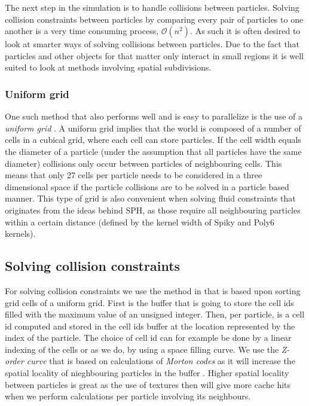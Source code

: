 The next step in the simulation is to handle collisions between particles.
Solving collision constraints between particles by comparing every pair of
particles to one another is a very time consuming process,
$\mathcal{O}(n^{2})$. As such it is often desired to look at smarter ways of
solving collisions between particles. Due to the fact that particles and other
objects for that matter only interact in small regions it is well suited to
look at methods involving spatial subdivisions.

\subsubsection{Uniform grid}

One such method that also performs well and is easy to parallelize is the use
of a \textit{uniform grid} \cite{Green}. A uniform grid implies that the world
is composed of a number of cells in a cubical grid, where each cell can store
particles. If the cell width equals the diameter of a particle (under the
assumption that all particles have the same diameter) collisions only occur
between particles of neighbouring cells. This means that only 27 cells per
particle needs to be considered in a three dimensional space if the particle
collisions are to be solved in a particle based manner. This type of grid is
also convenient when solving fluid constraints that originates from the ideas
behind SPH, as those require all neighbouring particles within a certain
distance (defined by the kernel width of Spiky and Poly6 kernels).

\subsection{Solving collision constraints}

For solving collision constraints we use the method in
\cite{Green} that is based upon sorting grid cells of a uniform grid. First is
the buffer that is going to store the cell ids filled with the maximum value of
an unsigned integer.  Then, per particle, is a cell id computed and stored in
the cell ids buffer at the location represented by the index of the particle.
The choice of cell id can for example be done by a linear indexing of the cells
or as we do, by using a space filling curve. We use the \textit{Z-order curve}
that is based on calculations of \textit{Morton codes} as it will increase the
spatial locality of nieghbouring particles in the buffer \cite{Green}. Higher
spatial locality between particles is great as the use of textures then will
give more cache hits when we perform calculations per particle involving its
neighbours.

